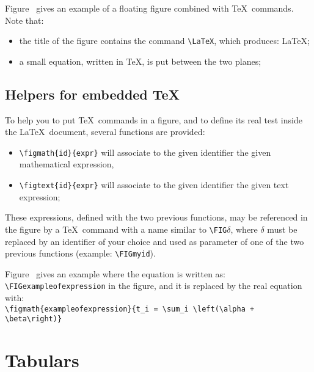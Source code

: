 \documentclass[book,taskpackage,specpackage,codepackage]{upmethodology-document}
\begin{document}

Figure~ gives an example of a floating figure combined with \TeX\ commands. Note that:
\begin{itemize}
\item the title of the figure contains the command \texttt{{\textbackslash}LaTeX}, which produces: \LaTeX;
\item a small equation, written in \TeX, is put between the two planes;
\end{itemize}

\subsection{Helpers for embedded \TeX}

To help you to put \TeX\ commands in a figure, and to define its real test inside the \LaTeX\ document, several functions are provided:
\begin{itemize}
\item \texttt{{\textbackslash}figmath\{id\}\{expr\}} will associate to the given identifier the given mathematical expression,
\item \texttt{{\textbackslash}figtext\{id\}\{expr\}} will associate to the given identifier the given text expression;
\end{itemize}

These expressions, defined with the two previous functions, may be referenced in the figure by a \TeX\ command with a name similar to \texttt{{\textbackslash}FIG$\delta$}, where $\delta$ must be replaced by an identifier of your choice and used as parameter of one of the two previous functions (example: \texttt{{\textbackslash}FIGmyid}).

Figure~ gives an example where the equation is written as: \texttt{{\textbackslash}FIGexampleofexpression} in the figure, and it is replaced by the real equation with: \\
\texttt{{\textbackslash}figmath\{exampleofexpression\}\{t\_i = {\textbackslash}sum\_i {\textbackslash}left({\textbackslash}alpha + {\textbackslash}beta{\textbackslash}right)\}}



\section{Tabulars}
\label{section:mtabular}
\end{document}
